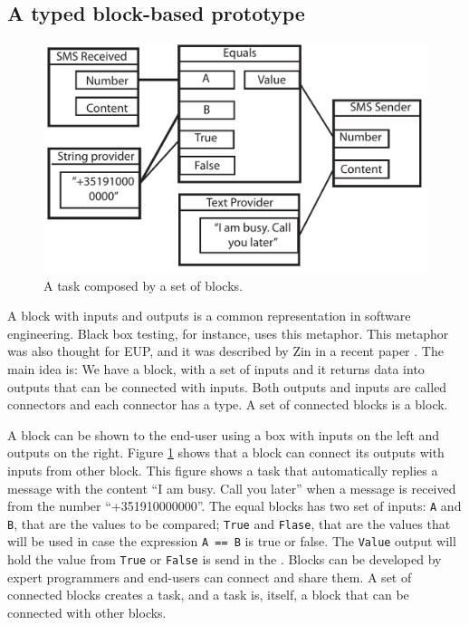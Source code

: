 \documentclass[9pt,a4paper]{extarticle}
\begin{document}
\begin{multicols}{2}
\subsection{A typed block-based prototype}

\begin{figure}[H]
\centerline{\includegraphics[scale=.43]{block_example.pdf}}
\label{fig:block}
\caption{A task composed by a set of blocks.} 
\end{figure}

A block with inputs and outputs is a common representation in software engineering. 
Black box testing, for instance, uses this metaphor. 
This metaphor was also thought for EUP, and it was described by Zin in a recent paper \cite{Zin2011}. 
The main idea is: We have a block, with a set of inputs and it returns data into outputs that can be connected with inputs.
Both outputs and inputs are called connectors and each connector has a type. A set of connected blocks is a block. 

A block  can be shown to the end-user using a box with inputs on the left and outputs on the right. 
Figure \ref{fig:block} shows that a block can connect its outputs with inputs from other block. This figure shows a task that automatically replies a message with the content ``I am busy. Call you later'' when a message is received from the number ``+351910000000''. The equal blocks has two set of inputs: \texttt{A} and  \texttt{B}, that are the values to be compared; \texttt{True} and  \texttt{Flase},
that are the values that will be used in case the expression \texttt{A == B} is true or false. The \texttt{Value} output will hold the value from  \texttt{True} or  \texttt{False} is send in the  .
Blocks can be developed by expert programmers and end-users can connect and share them. 
A set of connected blocks creates a task, and a task is, itself, a block that can be connected with other blocks.


\end{multicols}
\end{document}
